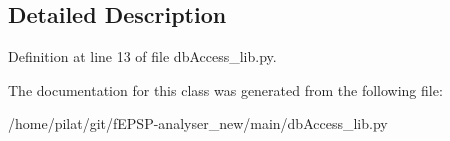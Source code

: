 \subsection{Detailed Description}


Definition at line 13 of file db\-Access\-\_\-lib.\-py.



The documentation for this class was generated from the following file\-:\begin{DoxyCompactItemize}
\item 
/home/pilat/git/f\-E\-P\-S\-P-\/analyser\-\_\-new/main/db\-Access\-\_\-lib.\-py\end{DoxyCompactItemize}
